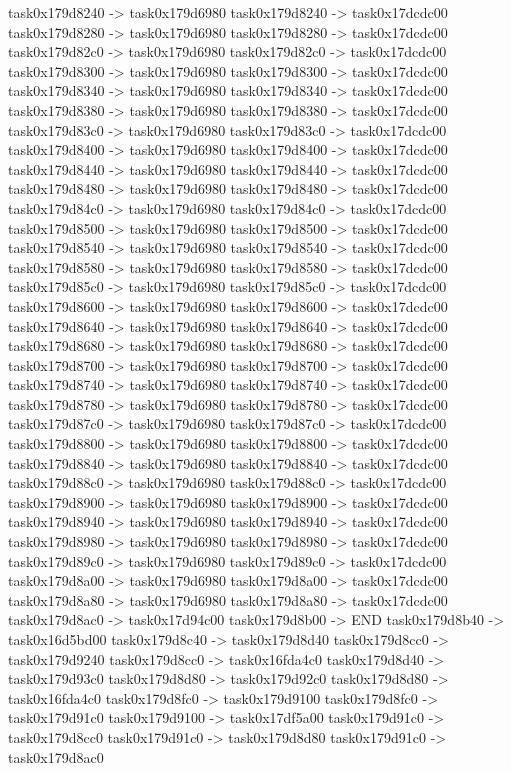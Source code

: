 {	task0x179d8240 -> task0x179d6980
	task0x179d8240 -> task0x17dcdc00
	task0x179d8280 -> task0x179d6980
	task0x179d8280 -> task0x17dcdc00
	task0x179d82c0 -> task0x179d6980
	task0x179d82c0 -> task0x17dcdc00
	task0x179d8300 -> task0x179d6980
	task0x179d8300 -> task0x17dcdc00
	task0x179d8340 -> task0x179d6980
	task0x179d8340 -> task0x17dcdc00
	task0x179d8380 -> task0x179d6980
	task0x179d8380 -> task0x17dcdc00
	task0x179d83c0 -> task0x179d6980
	task0x179d83c0 -> task0x17dcdc00
	task0x179d8400 -> task0x179d6980
	task0x179d8400 -> task0x17dcdc00
	task0x179d8440 -> task0x179d6980
	task0x179d8440 -> task0x17dcdc00
	task0x179d8480 -> task0x179d6980
	task0x179d8480 -> task0x17dcdc00
	task0x179d84c0 -> task0x179d6980
	task0x179d84c0 -> task0x17dcdc00
	task0x179d8500 -> task0x179d6980
	task0x179d8500 -> task0x17dcdc00
	task0x179d8540 -> task0x179d6980
	task0x179d8540 -> task0x17dcdc00
	task0x179d8580 -> task0x179d6980
	task0x179d8580 -> task0x17dcdc00
	task0x179d85c0 -> task0x179d6980
	task0x179d85c0 -> task0x17dcdc00
	task0x179d8600 -> task0x179d6980
	task0x179d8600 -> task0x17dcdc00
	task0x179d8640 -> task0x179d6980
	task0x179d8640 -> task0x17dcdc00
	task0x179d8680 -> task0x179d6980
	task0x179d8680 -> task0x17dcdc00
	task0x179d8700 -> task0x179d6980
	task0x179d8700 -> task0x17dcdc00
	task0x179d8740 -> task0x179d6980
	task0x179d8740 -> task0x17dcdc00
	task0x179d8780 -> task0x179d6980
	task0x179d8780 -> task0x17dcdc00
	task0x179d87c0 -> task0x179d6980
	task0x179d87c0 -> task0x17dcdc00
	task0x179d8800 -> task0x179d6980
	task0x179d8800 -> task0x17dcdc00
	task0x179d8840 -> task0x179d6980
	task0x179d8840 -> task0x17dcdc00
	task0x179d88c0 -> task0x179d6980
	task0x179d88c0 -> task0x17dcdc00
	task0x179d8900 -> task0x179d6980
	task0x179d8900 -> task0x17dcdc00
	task0x179d8940 -> task0x179d6980
	task0x179d8940 -> task0x17dcdc00
	task0x179d8980 -> task0x179d6980
	task0x179d8980 -> task0x17dcdc00
	task0x179d89c0 -> task0x179d6980
	task0x179d89c0 -> task0x17dcdc00
	task0x179d8a00 -> task0x179d6980
	task0x179d8a00 -> task0x17dcdc00
	task0x179d8a80 -> task0x179d6980
	task0x179d8a80 -> task0x17dcdc00
	task0x179d8ac0 -> task0x17d94c00
	task0x179d8b00 -> END
	task0x179d8b40 -> task0x16d5bd00
	task0x179d8c40 -> task0x179d8d40
	task0x179d8cc0 -> task0x179d9240
	task0x179d8cc0 -> task0x16fda4c0
	task0x179d8d40 -> task0x179d93c0
	task0x179d8d80 -> task0x179d92c0
	task0x179d8d80 -> task0x16fda4c0
	task0x179d8fc0 -> task0x179d9100
	task0x179d8fc0 -> task0x179d91c0
	task0x179d9100 -> task0x17df5a00
	task0x179d91c0 -> task0x179d8cc0
	task0x179d91c0 -> task0x179d8d80
	task0x179d91c0 -> task0x179d8ac0
}
